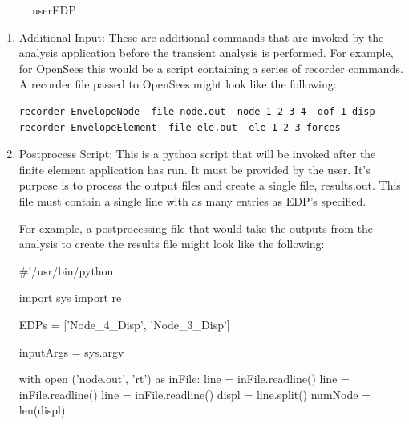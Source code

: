 \begin{figure}[!htbp]
  \caption{userEDP}
  \label{fig:userEDP}
\end{figure}

\begin{enumerate}
\item Additional Input: These are additional commands that are invoked
  by the analysis application before the transient analysis is
  performed. For example, for OpenSees this would be a script
  containing a series of recorder commands. \\

A recorder file passed to OpenSees might look like the following:
\begin{verbatim}
recorder EnvelopeNode -file node.out -node 1 2 3 4 -dof 1 disp
recorder EnvelopeElement -file ele.out -ele 1 2 3 forces
\end{verbatim}

\item Postprocess Script: This is a python script that will be invoked
  after the finite element application has run. It must be provided by
  the user. It's purpose is to process the output files and create a
  single file, results.out. This file must contain a single line with
  as many entries as EDP's specified.

For example, a postprocessing file that would take the outputs from the analysis to create the results file might look like the following:

\begin{python}
#!/usr/bin/python                                                                 

import sys
import re

EDPs = ['Node_4_Disp', 'Node_3_Disp']

inputArgs = sys.argv

with open ('node.out', 'rt') as inFile:
    line = inFile.readline()
    line = inFile.readline()
    line = inFile.readline()
    displ = line.split()
    numNode = len(displ)


\end{python}
\end{enumerate}
